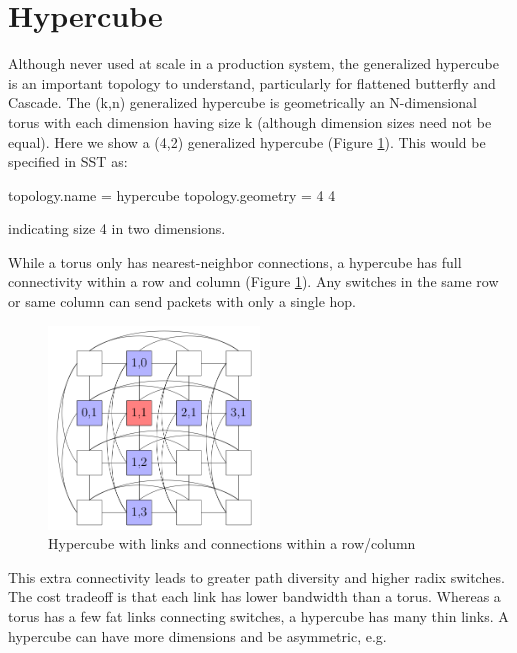\section{Hypercube}
\label{subsec:tutorial:hypercube}

Although never used at scale in a production system, the generalized hypercube is an important topology to understand, particularly for flattened butterfly and Cascade.
The (k,n) generalized hypercube is geometrically an N-dimensional torus with each dimension having size k (although dimension sizes need not be equal).
Here we show a (4,2) generalized hypercube (Figure \ref{fig:topologies:hypercubeConnected}).  This would be specified in SST as:

\begin{ViFile}
topology.name = hypercube
topology.geometry = 4 4 
\end{ViFile}
indicating size 4 in two dimensions. 

While a torus only has nearest-neighbor connections, a hypercube has full connectivity within a row and column (Figure \ref{fig:topologies:hypercubeConnected}).
Any switches in the same row or same column can send packets with only a single hop.

\begin{figure}[h!]
\centering
\includegraphics[width=0.5\textwidth]{figures/tikz/hypercube/hypercube_connected.png}
\caption{Hypercube with links and connections within a row/column}
\label{fig:topologies:hypercubeConnected}
\end{figure}

This extra connectivity leads to greater path diversity and higher radix switches.
The cost tradeoff is that each link has lower bandwidth than a torus. 
Whereas a torus has a few fat links connecting switches, a hypercube has many thin links.
A hypercube can have more dimensions and be asymmetric, e.g.

